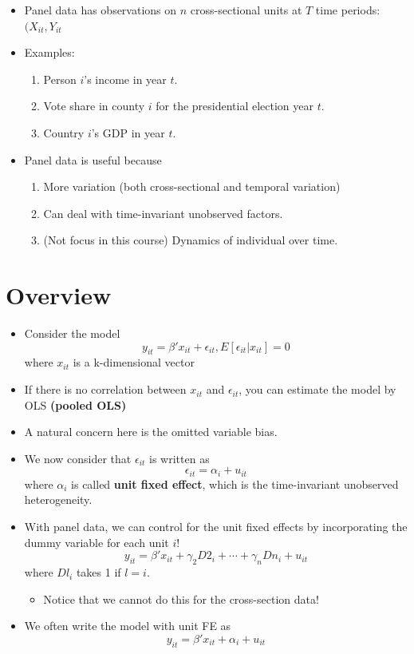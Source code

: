 \documentclass[]{book}
\providecommand{\tightlist}{%
  \setlength{\itemsep}{0pt}\setlength{\parskip}{0pt}}
\begin{document}
\begin{itemize}
\tightlist
\item
  Panel data has observations on \(n\) cross-sectional units at \(T\)
  time periods: \((X_{it}, Y_{it}\)
\item
  Examples:

  \begin{enumerate}
  \def\labelenumi{\arabic{enumi}.}
  \tightlist
  \item
    Person \(i\)'s income in year \(t\).
  \item
    Vote share in county \(i\) for the presidential election year \(t\).
  \item
    Country \(i\)'s GDP in year \(t\).
  \end{enumerate}
\item
  Panel data is useful because

  \begin{enumerate}
  \def\labelenumi{\arabic{enumi}.}
  \tightlist
  \item
    More variation (both cross-sectional and temporal variation)
  \item
    Can deal with time-invariant unobserved factors.
  \item
    (Not focus in this course) Dynamics of individual over time.
  \end{enumerate}
\end{itemize}

\section{Overview}\label{overview}

\begin{itemize}
\tightlist
\item
  Consider the model \[
  y_{it} = \beta' x_{it} + \epsilon_{it}, E[\epsilon_{it} | x_{it} ] = 0
  \] where \(x_{it}\) is a k-dimensional vector
\item
  If there is no correlation between \(x_{it}\) and \(\epsilon_{it}\),
  you can estimate the model by OLS \textbf{(pooled OLS)}
\item
  A natural concern here is the omitted variable bias.
\item
  We now consider that \(\epsilon_{it}\) is written as \[
  \epsilon_{it} = \alpha_i + u_{it}
  \] where \(\alpha_i\) is called \textbf{unit fixed effect}, which is
  the time-invariant unobserved heterogeneity.
\item
  With panel data, we can control for the unit fixed effects by
  incorporating the dummy variable for each unit \(i\)! \[
  y_{it} = \beta' x_{it} + \gamma_2 D2_i + \cdots + \gamma_n Dn_i + u_{it}
  \] where \(Dl_i\) takes 1 if \(l=i\).

  \begin{itemize}
  \tightlist
  \item
    Notice that we cannot do this for the cross-section data!
  \end{itemize}
\item
  We often write the model with unit FE as \[
  y_{it} = \beta' x_{it} + \alpha_i + u_{it}
  \]
\end{itemize}
\end{document}
